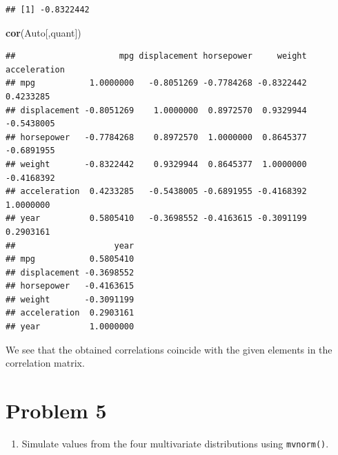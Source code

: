 \documentclass[]{article}
\newenvironment{Shaded}{\begin{snugshade}}{\end{snugshade}}
\newcommand{\KeywordTok}[1]{\textcolor[rgb]{0.13,0.29,0.53}{\textbf{#1}}}
\newcommand{\NormalTok}[1]{#1}
\providecommand{\tightlist}{%
  \setlength{\itemsep}{0pt}\setlength{\parskip}{0pt}}
\begin{document}
\begin{verbatim}
## [1] -0.8322442
\end{verbatim}

\begin{Shaded}
\begin{Highlighting}[]
\KeywordTok{cor}\NormalTok{(Auto[,quant])}
\end{Highlighting}
\end{Shaded}

\begin{verbatim}
##                     mpg displacement horsepower     weight acceleration
## mpg           1.0000000   -0.8051269 -0.7784268 -0.8322442    0.4233285
## displacement -0.8051269    1.0000000  0.8972570  0.9329944   -0.5438005
## horsepower   -0.7784268    0.8972570  1.0000000  0.8645377   -0.6891955
## weight       -0.8322442    0.9329944  0.8645377  1.0000000   -0.4168392
## acceleration  0.4233285   -0.5438005 -0.6891955 -0.4168392    1.0000000
## year          0.5805410   -0.3698552 -0.4163615 -0.3091199    0.2903161
##                    year
## mpg           0.5805410
## displacement -0.3698552
## horsepower   -0.4163615
## weight       -0.3091199
## acceleration  0.2903161
## year          1.0000000
\end{verbatim}

We see that the obtained correlations coincide with the given elements
in the correlation matrix.

\section{Problem 5}\label{problem-5}

\begin{enumerate}
\def\labelenumi{\alph{enumi})}
\tightlist
\item
  Simulate values from the four multivariate distributions using
  \texttt{mvnorm()}.
\end{enumerate}
\end{document}
